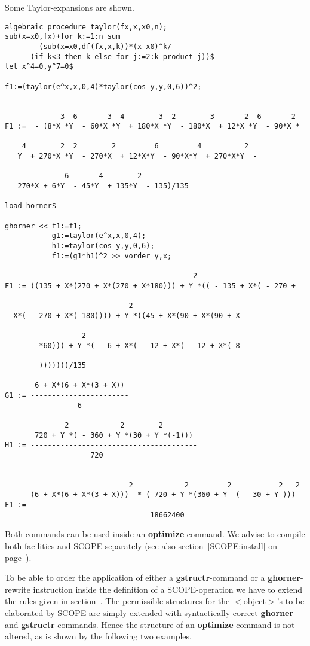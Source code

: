 \example\label{ex:3.2}

Some Taylor-expansions are shown.
\newpage
{\small
\begin{verbatim}
algebraic procedure taylor(fx,x,x0,n);
sub(x=x0,fx)+for k:=1:n sum
        (sub(x=x0,df(fx,x,k))*(x-x0)^k/
      (if k<3 then k else for j:=2:k product j))$
let x^4=0,y^7=0$

f1:=(taylor(e^x,x,0,4)*taylor(cos y,y,0,6))^2;


             3  6       3  4        3  2        3       2  6       2
F1 :=  - (8*X *Y  - 60*X *Y  + 180*X *Y  - 180*X  + 12*X *Y  - 90*X *

    4        2  2        2         6         4          2
   Y  + 270*X *Y  - 270*X  + 12*X*Y  - 90*X*Y  + 270*X*Y  -

              6       4        2
   270*X + 6*Y  - 45*Y  + 135*Y  - 135)/135

load horner$

ghorner << f1:=f1;
           g1:=taylor(e^x,x,0,4);
           h1:=taylor(cos y,y,0,6);
           f1:=(g1*h1)^2 >> vorder y,x;

                                            2
F1 := ((135 + X*(270 + X*(270 + X*180))) + Y *(( - 135 + X*( - 270 +

                             2
  X*( - 270 + X*(-180)))) + Y *((45 + X*(90 + X*(90 + X

                  2
        *60))) + Y *( - 6 + X*( - 12 + X*( - 12 + X*(-8

        )))))))/135

       6 + X*(6 + X*(3 + X))
G1 := -----------------------
                 6

              2            2        2
       720 + Y *( - 360 + Y *(30 + Y *(-1)))
H1 := ---------------------------------------
                    720


                             2            2         2           2   2
      (6 + X*(6 + X*(3 + X)))  * (-720 + Y *(360 + Y  ( - 30 + Y )))
F1 := ---------------------------------------------------------------
                                  18662400
\end{verbatim}
}

Both commands can be used inside an {\bf optimize}-command. We advise
to compile both facilities and SCOPE separately (see also
section~\ref{SCOPE:install} on page~\pageref{SCOPE:install}).

To be able to order the application of either a {\bf gstructr}-command or
a {\bf ghorner}-rewrite instruction inside the definition of a
SCOPE-operation we have to extend the rules given in
section~\label{SCOPE:2.2}.  The permissible structures for the
$<$object$>$'s to be elaborated by SCOPE are simply extended with
syntactically correct {\bf ghorner}-and {\bf gstructr}-commands.  Hence
the structure of an {\bf optimize}-command is not altered, as is shown by
the following two examples.

